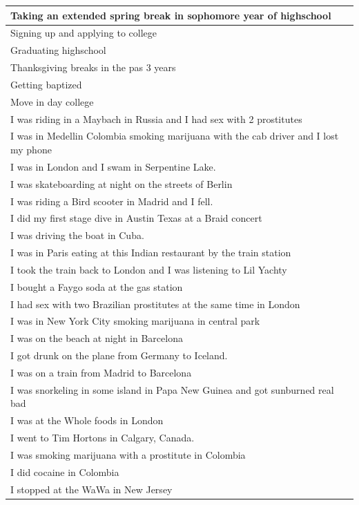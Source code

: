\documentclass[
  .7em,
  letterpaper,
  DIV=11,
  numbers=noendperiod]{scrartcl}
\begin{document}
\begin{table}
\begin{tabular}{l}
\hline
Taking an extended spring break in sophomore year of highschool\\
\hline
Signing up and applying to college\\
\hline
Graduating highschool\\
\hline
Thanksgiving breaks in the pas 3 years\\
\hline
Getting baptized\\
\hline
Move in day college\\
\hline
I was riding in a Maybach in Russia and I had sex with 2 prostitutes\\
\hline
I was in Medellin Colombia smoking marijuana with the cab driver and I lost my phone\\
\hline
I was in London and I swam in Serpentine Lake.\\
\hline
I was skateboarding at night on the streets of Berlin\\
\hline
I was riding a Bird scooter in Madrid and I fell.\\
\hline
I did my first stage dive in Austin Texas at a Braid concert\\
\hline
I was driving the boat in Cuba.\\
\hline
I was in Paris eating at this Indian restaurant by the train station\\
\hline
I took the train back to London and I was listening to Lil Yachty\\
\hline
I bought a Faygo soda at the gas station\\
\hline
I had sex with two Brazilian prostitutes at the same time in London\\
\hline
I was in New York City smoking marijuana in central park\\
\hline
I was on the beach at night in Barcelona\\
\hline
I got drunk on the plane from Germany to Iceland.\\
\hline
I was on a train from Madrid to Barcelona\\
\hline
I was snorkeling in some island in Papa New Guinea and got sunburned real bad\\
\hline
I was at the Whole foods in London\\
\hline
I went to Tim Hortons in Calgary, Canada.\\
\hline
I was smoking marijuana with a prostitute in Colombia\\
\hline
I did cocaine in Colombia\\
\hline
I stopped at the WaWa in New Jersey\\

\end{tabular}
\end{table}
\end{document}
